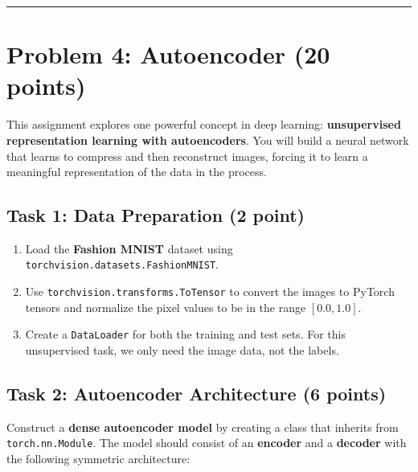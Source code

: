 \documentclass[
  letterpaper,
  DIV=11,
  numbers=noendperiod]{scrartcl}
\providecommand{\tightlist}{%
  \setlength{\itemsep}{0pt}\setlength{\parskip}{0pt}}\usepackage{longtable,booktabs,array}
\begin{document}
\begin{center}\rule{0.5\linewidth}{0.5pt}\end{center}

\section{Problem 4: Autoencoder (20
points)}\label{problem-4-autoencoder-20-points}

This assignment explores one powerful concept in deep learning:
\textbf{unsupervised representation learning with autoencoders}. You
will build a neural network that learns to compress and then reconstruct
images, forcing it to learn a meaningful representation of the data in
the process.

\subsection{Task 1: Data Preparation (2
point)}\label{task-1-data-preparation-2-point}

\begin{enumerate}
\def\labelenumi{\arabic{enumi}.}
\tightlist
\item
  Load the \textbf{Fashion MNIST} dataset using
  \texttt{torchvision.datasets.FashionMNIST}.
\item
  Use \texttt{torchvision.transforms.ToTensor} to convert the images to
  PyTorch tensors and normalize the pixel values to be in the range
  \([0.0, 1.0]\).
\item
  Create a \texttt{DataLoader} for both the training and test sets. For
  this unsupervised task, we only need the image data, not the labels.
\end{enumerate}

\subsection{Task 2: Autoencoder Architecture (6
points)}\label{task-2-autoencoder-architecture-6-points}

Construct a \textbf{dense autoencoder model} by creating a class that
inherits from \texttt{torch.nn.Module}. The model should consist of an
\textbf{encoder} and a \textbf{decoder} with the following symmetric
architecture:
\end{document}
